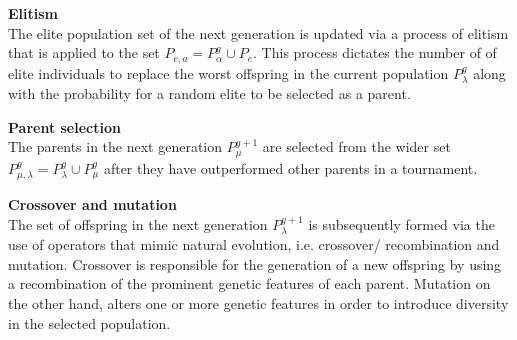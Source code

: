 \begin{EA}
\item \textbf{Elitism} \\
The elite population set of the next generation is updated 
via a process of elitism that is applied to the set 
$P_{e,a} = P_{α}^g \cup P_{e}$. This process dictates the number of 
of elite individuals to replace the worst offspring in the current
population $P_{λ}^{g}$ along with the probability for a random 
elite to be selected as a parent. 

\item \textbf{Parent selection} \\
The parents in the next generation $P_{μ}^{g+1}$ are 
selected from the wider set $P_{μ,λ}^g = P_{λ}^g \cup 
P_{μ}^g$ after they have outperformed other parents in a 
tournament.

\item \textbf{Crossover and mutation} \\
 The set of offspring in the next generation 
$P_{λ}^{g+1}$ is subsequently formed via the use of 	
operators that mimic natural evolution, i.e. crossover/
recombination and mutation. Crossover is responsible for the 
generation of a new offspring by using a recombination of 
the prominent genetic features of each parent. Mutation on 
the other hand, alters one or more genetic features in order 
to introduce diversity in the selected population. 




\end{EA}

